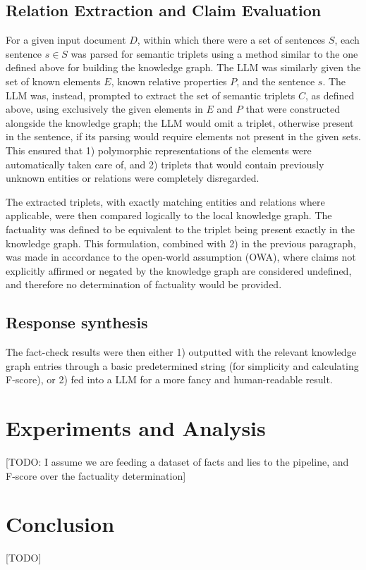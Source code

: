 \documentclass[11pt]{article}
\begin{document}
\subsection{Relation Extraction and Claim Evaluation}
For a given input document $D$, within which there were a set of sentences $S$, each sentence $s\in S$ was parsed for semantic triplets using a method similar to the one defined above for building the knowledge graph. The LLM was similarly given the set of known elements $E$, known relative properties $P$, and the sentence $s$. The LLM was, instead, prompted to extract the set of semantic triplets $C$, as defined above, using exclusively the given elements in $E$ and $P$ that were constructed alongside the knowledge graph; the LLM would omit a triplet, otherwise present in the sentence, if its parsing would require elements not present in the given sets. This ensured that 1) polymorphic representations of the elements were automatically taken care of, and 2) triplets that would contain previously unknown entities or relations were completely disregarded. 

The extracted triplets, with exactly matching entities and relations where applicable, were then compared logically to the local knowledge graph. The factuality was defined to be equivalent to the triplet being present exactly in the knowledge graph. This formulation, combined with 2) in the previous paragraph, was made in accordance to the open-world assumption (OWA), where claims not explicitly affirmed or negated by the knowledge graph are considered undefined, and therefore no determination of factuality would be provided.

\subsection{Response synthesis}
The fact-check results were then either 1) outputted with the relevant knowledge graph entries through a basic predetermined string (for simplicity and calculating F-score), or 2) fed into a LLM for a more fancy and human-readable result. 

\section{Experiments and Analysis}
[TODO: I assume we are feeding a dataset of facts and lies to the pipeline, and F-score over the factuality determination]

\section{Conclusion}
[TODO]
\end{document}
